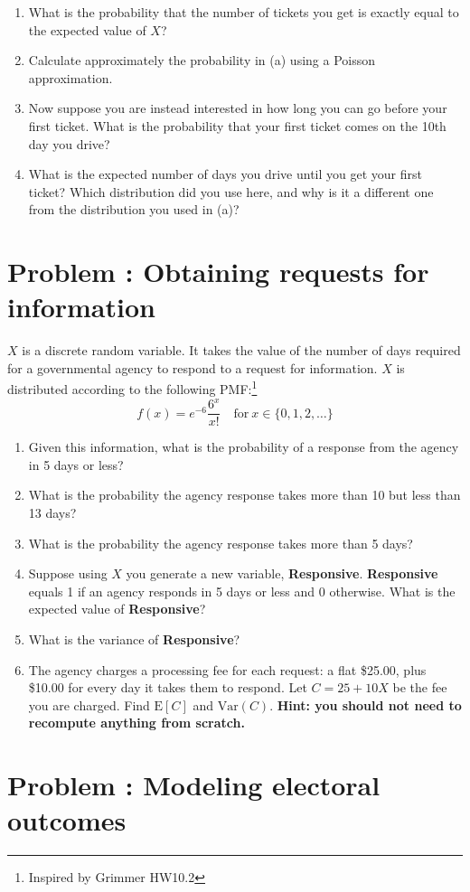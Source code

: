 \documentclass[11pt]{article}
\newcommand{\E}{\mathrm{E}}
\newcommand{\Var}{\mathrm{Var}}
\newcounter{problem}
\newcommand{\problem}[1]{\stepcounter{problem}\section*{Problem \theproblem: #1}}
\begin{document}
\begin{enumerate}[label=\alph*.]
\item What is the probability that the number of tickets you get is
  exactly equal to the expected value of $X$?
\item Calculate approximately the probability in (a) using a Poisson
  approximation.
\item Now suppose you are instead interested in how long you can go
  before your first ticket. What is the probability that your first
  ticket comes on the 10th day you drive?
\item What is the expected number of days you drive until you get your
  first ticket? Which distribution did you use here, and why is it a
  different one from the distribution you used in (a)?
\end{enumerate}

\problem{Obtaining requests for information}

$X$ is a discrete random variable. It takes the value of the number of
days required for a governmental agency to respond to a request for
information. $X$ is distributed according to the following
PMF:\footnote{Inspired by Grimmer HW10.2}
$$
f(x) = e^{-6} \dfrac{6^x}{x!} \quad \mbox{for} \ x \in \{0, 1, 2, \ldots\}
$$

\begin{enumerate}[label=\alph*.]
\item Given this information, what is the probability of a response from
  the agency in 5 days or less?
\item What is the probability the agency response takes more than 10 but
  less than 13 days?
\item What is the probability the agency response takes more than 5
  days?
\item Suppose using $X$ you generate a new variable,
  \textbf{Responsive}. \textbf{Responsive} equals 1 if an agency
  responds in 5 days or less and 0 otherwise. What is the expected value
  of \textbf{Responsive}?
\item What is the variance of \textbf{Responsive}?
\item The agency charges a processing fee for each request: a flat
  \$25.00, plus \$10.00 for every day it takes them to respond. Let
  $C = 25 + 10X$ be the fee you are charged. Find $\E[C]$ and
  $\Var(C)$. \textbf{Hint: you should not need to recompute anything
    from scratch.}
\end{enumerate}

\problem{Modeling electoral outcomes}
\end{document}
